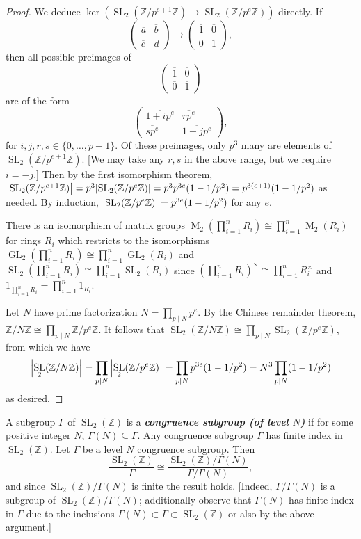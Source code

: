 \documentclass[10pt,leqno]{article}
\newcommand{\textib}[1]{\textbf{\textit{#1}}}
\DeclareMathOperator{\Mat}{M}
\DeclareMathOperator{\GL}{GL}
\DeclareMathOperator{\SL}{SL}
\begin{document}
\begin{proof}
    We deduce $\ker(\SL_2(\mathbb{Z}/p^{e+1}\mathbb{Z})\to \SL_2(\mathbb{Z}/p^e\mathbb{Z}))$ directly. If \[\begin{pmatrix}
        \overline a & \overline b \\ \overline c & \overline d
    \end{pmatrix}\mapsto \begin{pmatrix}
        \overline 1 & \overline 0 \\ \overline 0 & \overline 1
    \end{pmatrix},\] then all possible preimages of \[\begin{pmatrix}
        \overline 1 & \overline 0 \\ \overline 0 & \overline 1
    \end{pmatrix}\] are of the form \[\begin{pmatrix}
        \overline{1+ip^e} & \overline{rp^e} \\ \overline{sp^e} & \overline{1+jp^e}
    \end{pmatrix},\] for $i,j,r,s\in \{0,\dots,p-1\}$. Of these preimages, only $p^3$ many are elements of $\SL_2(\mathbb{Z}/p^{e+1}\mathbb{Z})$. [We may take any $r,s$ in the above range, but we require $i=-j$.] Then by the first isomorphism theorem, $\abs{\SL_2(\mathbb{Z}/p^{e+1}\mathbb{Z})} = p^3\abs{\SL_2(\mathbb{Z}/p^e\mathbb{Z})} = p^3p^{3e}(1-1/p^2) = p^{3(e+1)}(1-1/p^2)$ as needed. By induction, $\abs{\SL_2(\mathbb{Z}/p^e\mathbb{Z})} = p^{3e}(1-1/p^2)$ for any $e$.

    There is an isomorphism of matrix groups $\Mat_2(\prod_{i=1}^nR_i)\cong \prod_{i=1}^n\Mat_2(R_i)$ for rings $R_i$ which restricts to the isomorphisms $\GL_2(\prod_{i=1}^nR_i)\cong \prod_{i=1}^n\GL_2(R_i)$ and $\SL_2(\prod_{i=1}^nR_i)\cong \prod_{i=1}^n\SL_2(R_i)$ since $(\prod_{i=1}^nR_i)^\times\cong \prod_{i=1}^nR_i^\times$ and $1_{\prod_{i=1}^nR_i} = \prod_{i=1}^n1_{R_i}$.

    Let $N$ have prime factorization $N = \prod_{p\mid N} p^{e}$. By the Chinese remainder theorem, $\mathbb{Z}/N\mathbb{Z}\cong \prod_{p\mid N}\mathbb{Z}/p^{e}\mathbb{Z}$. It follows that $\SL_2(\mathbb{Z}/N\mathbb{Z})\cong \prod_{p\mid N}\SL_2(\mathbb{Z}/p^{e}\mathbb{Z})$, from which we have \[\abs{\SL_2(\mathbb{Z}/N\mathbb{Z})}= \prod_{p\mid N}\abs{\SL_2(\mathbb{Z}/p^{e}\mathbb{Z})} = \prod_{p\mid N}p^{3e}(1-1/p^2) = N^3\prod_{p\mid N}(1-1/p^2)\] as desired.
\end{proof}

A subgroup $\varGamma$ of $\SL_2(\mathbb{Z})$ is a \textib{congruence subgroup (of level $N$)} if for some positive integer $N$, $\varGamma(N)\subseteq \varGamma$. Any congruence subgroup $\varGamma$ has finite index in $\SL_2(\mathbb{Z})$. Let $\varGamma$ be a level $N$ congruence subgroup. Then 
\[\frac{\SL_2(\mathbb{Z})}{\varGamma}\cong \frac{\SL_2(\mathbb{Z})/\varGamma(N)}{\varGamma/\varGamma(N)},\] and since $\SL_2(\mathbb{Z})/\varGamma(N)$ is finite the result holds. [Indeed, $\varGamma/\varGamma(N)$ is a subgroup of $\SL_2(\mathbb{Z})/\varGamma(N)$; additionally observe that $\varGamma(N)$ has finite index in $\varGamma$ due to the inclusions $\varGamma(N)\subset \varGamma \subset \SL_2(\mathbb{Z})$ or also by the above argument.]
\end{document}
